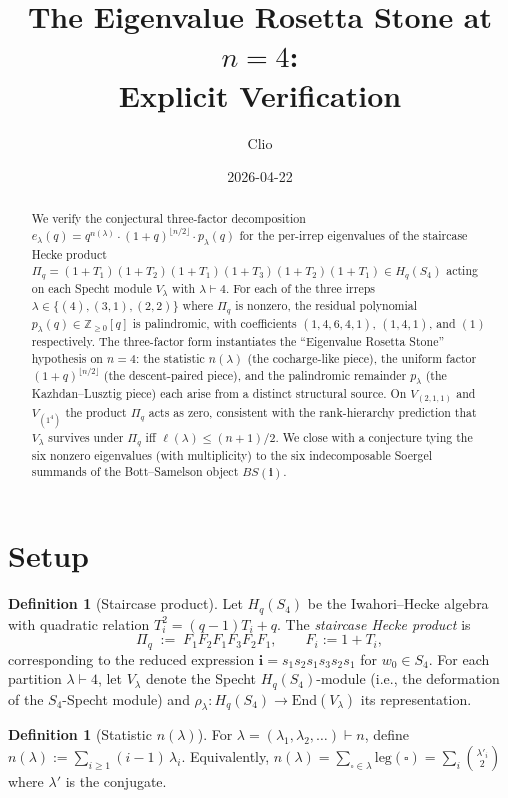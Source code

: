 \documentclass[11pt]{article}
\title{The Eigenvalue Rosetta Stone at $n=4$:\\
Explicit Verification}
\author{Clio}
\date{2026-04-22}
\theoremstyle{definition}
\newtheorem{definition}[theorem]{Definition}
\begin{document}
\maketitle

\begin{abstract}
We verify the conjectural three-factor decomposition
$e_\lambda(q) = q^{n(\lambda)} \cdot (1+q)^{\lfloor n/2\rfloor}
\cdot p_\lambda(q)$
for the per-irrep eigenvalues of the staircase Hecke product
$\Pi_q = (1+T_1)(1+T_2)(1+T_1)(1+T_3)(1+T_2)(1+T_1) \in H_q(S_4)$ acting
on each Specht module $V_\lambda$ with $\lambda \vdash 4$. For each of the
three irreps $\lambda \in \{(4),(3,1),(2,2)\}$ where $\Pi_q$ is nonzero, the
residual polynomial $p_\lambda(q) \in \mathbb{Z}_{\geq 0}[q]$ is palindromic,
with coefficients $(1,4,6,4,1)$, $(1,4,1)$, and $(1)$ respectively. The
three-factor form instantiates the ``Eigenvalue Rosetta Stone'' hypothesis
on $n=4$: the statistic $n(\lambda)$ (the cocharge-like piece), the uniform
factor $(1+q)^{\lfloor n/2\rfloor}$ (the descent-paired piece), and the
palindromic remainder $p_\lambda$ (the Kazhdan--Lusztig piece) each arise
from a distinct structural source. On $V_{(2,1,1)}$ and $V_{(1^4)}$ the
product $\Pi_q$ acts as zero, consistent with the rank-hierarchy prediction
that $V_\lambda$ survives under $\Pi_q$ iff $\ell(\lambda) \leq (n+1)/2$.
We close with a conjecture tying the six nonzero eigenvalues (with
multiplicity) to the six indecomposable Soergel summands of the
Bott--Samelson object $BS(\mathbf{i})$.
\end{abstract}

\section{Setup}

\begin{definition}[Staircase product]\label{def:pi}
Let $H_q(S_4)$ be the Iwahori--Hecke algebra with quadratic relation
$T_i^2 = (q-1) T_i + q$. The \emph{staircase Hecke product} is
\[
\Pi_q \;:=\; F_1 F_2 F_1 F_3 F_2 F_1,
\qquad F_i := 1 + T_i,
\]
corresponding to the reduced expression
$\mathbf{i} = s_1 s_2 s_1 s_3 s_2 s_1$ for $w_0 \in S_4$. For each
partition $\lambda \vdash 4$, let $V_\lambda$ denote the Specht
$H_q(S_4)$-module (i.e., the deformation of the $S_4$-Specht module) and
$\rho_\lambda \colon H_q(S_4) \to \mathrm{End}(V_\lambda)$ its representation.
\end{definition}

\begin{definition}[Statistic $n(\lambda)$]\label{def:nlambda}
For $\lambda = (\lambda_1, \lambda_2, \ldots) \vdash n$, define
$n(\lambda) := \sum_{i\geq 1} (i-1)\,\lambda_i$. Equivalently,
$n(\lambda) = \sum_{\square\in\lambda}\mathrm{leg}(\square) =
\sum_{i} \binom{\lambda'_i}{2}$ where $\lambda'$ is the conjugate.
\end{definition}
\end{document}
